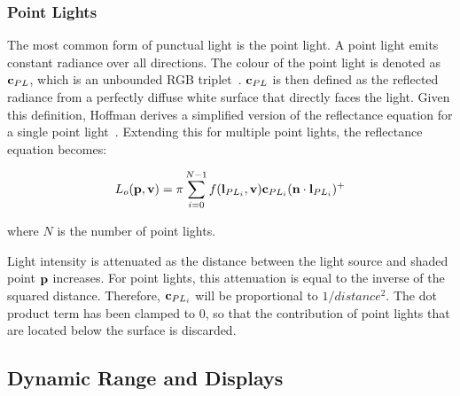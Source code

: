 \subsubsection{Point Lights}

The most common form of punctual light is the point light. A point light emits constant radiance over all directions. The colour of the point light is denoted as \begin{math}\mathbf{c}_{PL}\end{math}, which is an unbounded RGB triplet~\cite{HoffmanPBSBackground}. \begin{math}\mathbf{c}_{PL}\end{math} is then defined as the reflected radiance from a perfectly diffuse white surface that directly faces the light. Given this definition, Hoffman derives a simplified version of the reflectance equation for a single point light~\cite{HoffmanPBSBackground}. Extending this for multiple point lights, the reflectance equation becomes:

\begin{equation} \label{eq:PointLightsReflectanceEquation}
	L_o(\mathbf{p}, \mathbf{v}) = \pi\sum_{i = 0}^{N - 1}f(\mathbf{l}_{PL_i}, \mathbf{v})\mathbf{c}_{PL_i}(\mathbf{n}\cdot\mathbf{l}_{PL_i})^+
\end{equation}

where \begin{math}N\end{math} is the number of point lights.

Light intensity is attenuated as the distance between the light source and shaded point \begin{math}\mathbf{p}\end{math} increases. For point lights, this attenuation is equal to the inverse of the squared distance. Therefore, \begin{math}\mathbf{c}_{PL_i}\end{math} will be proportional to \begin{math}1 / distance^2\end{math}. The dot product term has been clamped to 0, so that the contribution of point lights that are located below the surface is discarded.

\subsection{Dynamic Range and Displays} \label{DynamicRangeAndDisplays}

